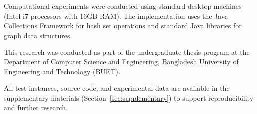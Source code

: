 \documentclass[12pt,a4paper]{article}
\theoremstyle{definition}
\theoremstyle{remark}
\begin{document}
Computational experiments were conducted using standard desktop machines (Intel i7 processors with 16GB RAM). The implementation uses the Java Collections Framework for hash set operations and standard Java libraries for graph data structures.

This research was conducted as part of the undergraduate thesis program at the Department of Computer Science and Engineering, Bangladesh University of Engineering and Technology (BUET).

All test instances, source code, and experimental data are available in the supplementary materials (Section~\ref{sec:supplementary}) to support reproducibility and further research.



\end{document}
